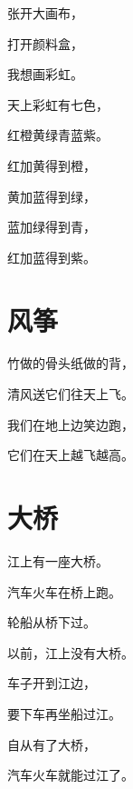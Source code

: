 \documentclass[12pt,UTF-8,openany]{ctexbook}
\begin{document}
\begin{large}
    
    张开大画布，
    
    打开颜料盒，
    
    我想画彩虹。
    
    天上彩虹有七色，
    
    红橙黄绿青蓝紫。
    
    红加黄得到橙，
    
    黄加蓝得到绿，
    
    蓝加绿得到青，
    
    红加蓝得到紫。
    
\end{large}



\chapter{风筝}

\begin{large}
    
    竹做的骨头纸做的背，
    
    清风送它们往天上飞。
    
    我们在地上边笑边跑，
    
    它们在天上越飞越高。
    
\end{large}





\chapter{大桥}

\begin{large}
    
    江上有一座大桥。
    
    汽车火车在桥上跑。
    
    轮船从桥下过。
    
    以前，江上没有大桥。
    
    车子开到江边，
    
    要下车再坐船过江。
    
    自从有了大桥，
    
    汽车火车就能过江了。
    
\end{large}
\end{document}
